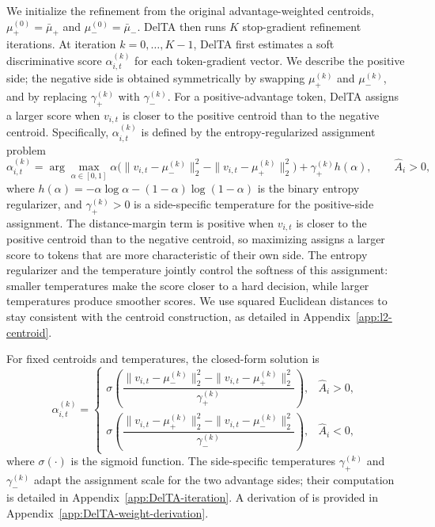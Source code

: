 \documentclass{article} %
\begin{document}
We initialize the refinement from the original advantage-weighted centroids, \(\mu_+^{(0)}=\bar\mu_+\) and \(\mu_-^{(0)}=\bar\mu_-\). 
DelTA then runs \(K\) stop-gradient refinement iterations. 
At iteration \(k=0,\dots,K-1\), DelTA first estimates a soft discriminative score \(\alpha_{i,t}^{(k)}\) for each token-gradient vector. 
We describe the positive side; the negative side is obtained symmetrically by swapping \(\mu_+^{(k)}\) and \(\mu_-^{(k)}\), and by replacing \(\gamma_+^{(k)}\) with \(\gamma_-^{(k)}\). 
For a positive-advantage token, DelTA assigns a larger score when \(v_{i,t}\) is closer to the positive centroid than to the negative centroid. 
Specifically, \(\alpha_{i,t}^{(k)}\) is defined by the entropy-regularized assignment problem
\begin{equation}
\label{eq:DelTA-assignment-objective}
\alpha_{i,t}^{(k)}
=
\arg\max_{\alpha\in[0,1]}
\alpha
\Big(
\|v_{i,t}-\mu_-^{(k)}\|_2^2
-
\|v_{i,t}-\mu_+^{(k)}\|_2^2
\Big)
+
\gamma_+^{(k)}h(\alpha),
\qquad \hat A_i>0,
\end{equation}
where \(h(\alpha)=-\alpha\log\alpha-(1-\alpha)\log(1-\alpha)\) is the binary entropy regularizer, and \(\gamma_+^{(k)}>0\) is a side-specific temperature for the positive-side assignment. 
The distance-margin term is positive when \(v_{i,t}\) is closer to the positive centroid than to the negative centroid, so maximizing  assigns a larger score to tokens that are more characteristic of their own side. 
The entropy regularizer and the temperature jointly control the softness of this assignment: smaller temperatures make the score closer to a hard decision, while larger temperatures produce smoother scores. 
We use squared Euclidean distances to stay consistent with the centroid construction, as detailed in Appendix~\ref{app:l2-centroid}.

For fixed centroids and temperatures, the closed-form solution is
\begin{equation}
\label{eq:DelTA-alpha}
\alpha_{i,t}^{(k)}
=
\begin{cases}
\sigma\!\left(
\dfrac{
\|v_{i,t}-\mu_-^{(k)}\|_2^2
-
\|v_{i,t}-\mu_+^{(k)}\|_2^2
}{
\gamma_+^{(k)}
}
\right),
& \hat A_i>0,\\[1.2ex]
\sigma\!\left(
\dfrac{
\|v_{i,t}-\mu_+^{(k)}\|_2^2
-
\|v_{i,t}-\mu_-^{(k)}\|_2^2
}{
\gamma_-^{(k)}
}
\right),
& \hat A_i<0,
\end{cases}
\end{equation}
where \(\sigma(\cdot)\) is the sigmoid function. 
The side-specific temperatures \(\gamma_+^{(k)}\) and \(\gamma_-^{(k)}\) adapt the assignment scale for the two advantage sides; their computation is detailed in Appendix~\ref{app:DelTA-iteration}. 
A derivation of  is provided in Appendix~\ref{app:DelTA-weight-derivation}. 
\end{document}
